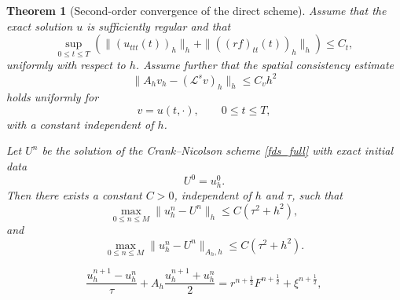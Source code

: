 \documentclass[10pt,a4paper]{amsart}
\newtheorem{theorem}{Theorem}
\begin{document}
\begin{theorem}[Second-order convergence of the direct scheme]
\label{thm:direct-convergence}
Assume that the exact solution \(u\) is sufficiently regular and that
\begin{equation}
\sup_{0\le t\le T}
\left(
\|(u_{ttt}(t))_h\|_h
+
\|((rf)_{tt}(t))_h\|_h
\right)
\le C_t,
\label{eq:time-regularity-nodal}
\end{equation}
uniformly with respect to \(h\).
Assume further that the spatial consistency estimate
\begin{equation}
\|A_h v_h-(\mathcal L^s v)_h\|_h
\le C_v h^2
\label{eq:spatial-consistency-thm}
\end{equation}
holds uniformly for
\[
v=u(t,\cdot),\qquad 0\le t\le T,
\]
with a constant independent of \(h\).

Let \(U^n\) be the solution of the Crank--Nicolson scheme
\eqref{fds_full}
with exact initial data
\[
U^0=u_h^0.
\]
Then there exists a constant \(C>0\), independent of \(h\) and \(\tau\),
such that
\begin{equation}
\max_{0\le n\le M}
\|u_h^n-U^n\|_h
\le
C(\tau^2+h^2),
\label{eq:L2-direct-convergence}
\end{equation}
and
\begin{equation}
\max_{0\le n\le M}
\|u_h^n-U^n\|_{A_h,h}
\le
C(\tau^2+h^2).
\label{eq:energy-direct-convergence}
\end{equation}
\end{theorem}

\begin{equation}
\frac{u_h^{n+1}-u_h^n}{\tau}
+
A_h\frac{u_h^{n+1}+u_h^n}{2}
=
r^{n+\frac12}F^{n+\frac12}
+
\xi^{n+\frac12},
\label{eq:exact-CN-relation-revised}
\end{equation}
\end{document}
